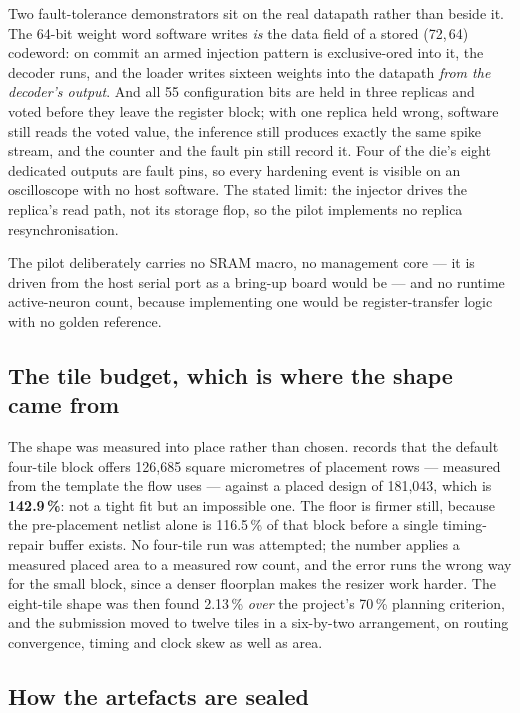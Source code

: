 Two fault-tolerance demonstrators sit on the real datapath rather than
beside it. The 64-bit weight word software writes \emph{is} the data
field of a stored (72,\,64) codeword: on commit an armed injection
pattern is exclusive-ored into it, the decoder runs, and the loader
writes sixteen weights into the datapath \emph{from the decoder's
output}. And all 55 configuration bits are held in three replicas and
voted before they leave the register block; with one replica held
wrong, software still reads the voted value, the inference still
produces exactly the same spike stream, and the counter and the fault
pin still record it. Four of the die's eight dedicated outputs are
fault pins, so every hardening event is visible on an oscilloscope with
no host software. The stated limit: the injector drives the replica's
read path, not its storage flop, so the pilot implements no replica
resynchronisation.

The pilot deliberately carries no SRAM macro, no management core ---
it is driven from the host serial port as a bring-up board would be ---
and no runtime active-neuron count, because implementing one would be
register-transfer logic with no golden reference.

\subsection{The tile budget, which is where the shape came from}

The shape was measured into place rather than chosen. 
records that the default four-tile block offers 126,685 square
micrometres of placement rows --- measured from the template the flow
uses --- against a placed design of 181,043, which is
\textbf{142.9\,\%}: not a tight fit but an impossible one. The floor is
firmer still, because the pre-placement netlist alone is 116.5\,\% of
that block before a single timing-repair buffer exists. No four-tile
run was attempted; the number applies a measured placed area to a
measured row count, and the error runs the wrong way for the small
block, since a denser floorplan makes the resizer work harder. The
eight-tile shape was then found 2.13\,\% \emph{over} the project's
70\,\% planning criterion, and the submission moved to twelve tiles in
a six-by-two arrangement, on routing convergence, timing and clock skew
as well as area.

\subsection{How the artefacts are sealed}

